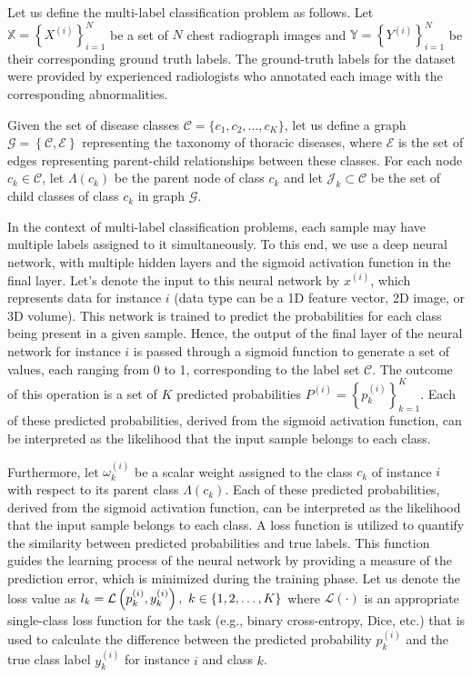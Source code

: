 \documentclass[final,1p,times,authoryear]{elsarticle}
\begin{document}
%
Let us define the multi-label classification problem as follows. Let $\mathbb{X} = {\left\{X^{(i)}\right\}}_{i=1}^{N} $ be a set of $N $ chest radiograph images and $\mathbb{Y} = {\left\{Y^{(i)}\right\}}_{i=1}^{N} $ be their corresponding ground truth labels. The ground-truth labels for the dataset were provided by experienced radiologists who annotated each image with the corresponding abnormalities.

Given the set of disease classes $\mathcal{C} = \{c_1,c_2,\dots,c_K\} $, let us define a  graph $\mathcal{G}=\left\{\mathcal{C},\mathcal{E}\right\} $ representing the taxonomy of thoracic diseases, where $\mathcal{E}$ is the set of edges representing parent-child relationships between these classes. For each node $c_k \in \mathcal{C} $, let $\Lambda (c_k)$ be the parent node of class $c_k $ and let $\mathcal{J}_k\subset \mathcal{C} $ be the set of child classes of class $c_k $ in graph $\mathcal{G}$.

In the context of multi-label classification problems, each sample may have multiple labels assigned to it simultaneously. To this end, we use a deep neural network, with multiple hidden layers and the sigmoid activation function in the final layer. Let's denote the input to this neural network by $x^{(i)}$, which represents data for instance $i$ (data type can be a 1D feature vector, 2D image, or 3D volume). This network is trained to predict the probabilities for each class being present in a given sample. Hence, the output of the final layer of the neural network for instance $i$ is passed through a sigmoid function to generate a set of values, each ranging from 0 to 1, corresponding to the label set $\mathcal{C} $.
The outcome of this operation is a set of $K $ predicted probabilities $P^{(i)}={\left\{p_k^{(i)}\right\}}_{k=1}^{K} $. Each of these predicted probabilities, derived from the sigmoid activation function, can be interpreted as the likelihood that the input sample belongs to each class.

Furthermore, let $\omega_k^{(i)} $ be a scalar weight assigned to the class $c_k $ of instance $i $ with respect to its parent class $\Lambda (c_k)$.
Each of these predicted probabilities, derived from the sigmoid activation function, can be interpreted as the likelihood that the input sample belongs to each class. A loss function is utilized to quantify the similarity between predicted probabilities and true labels. This function guides the learning process of the neural network by providing a measure of the prediction error, which is minimized during the training phase.
Let us denote the loss value as $l_k = \mathcal{L} \left(p_k^{(i)},y_k^{(i)}\right),\hspace{0.33em}k \in \{1,2,\dots,K\} $ where $\mathcal{L}(\cdot) $ is an appropriate single-class loss function for the task (e.g., binary cross-entropy, Dice, etc.) that is used to calculate the difference between the predicted probability $p_k^{(i)} $ and the true class label $y_k^{(i)} $ for instance $i$ and class $k $.
\end{document}
